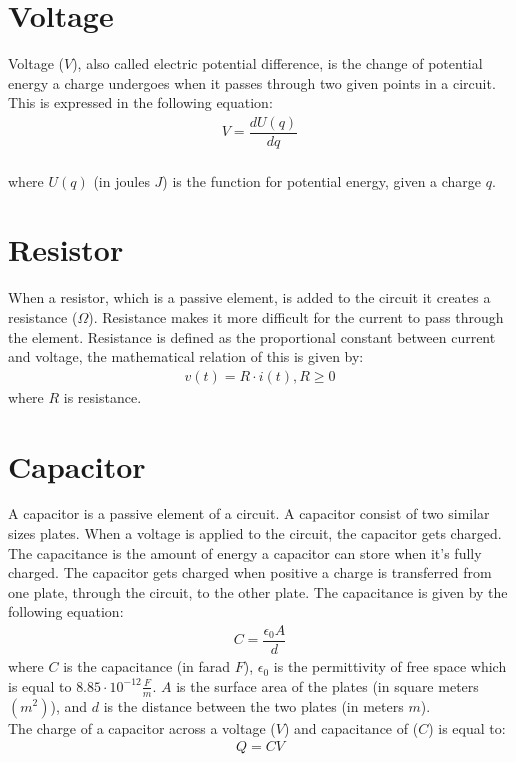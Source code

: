 \section{Voltage}
Voltage ($V$), also called electric potential difference, is the change of potential energy a charge undergoes when it passes through two given points in a circuit. This is expressed in the following equation:
\begin{align}
	V=\dfrac{dU(q)}{dq}
\end{align}
\\
where $U(q)$ (in joules $J$) is the function for potential energy, given a charge $q$.
\section{Resistor}
When a resistor, which is a passive element, is added to the circuit it creates a resistance ($\Omega$). Resistance makes it more difficult for the current to pass through the element. Resistance is defined as the proportional constant between current and voltage, the mathematical relation of this is given by:
\begin{align} 
\label{Ohm}
v(t)=R\cdot i(t),  R\geq0
\end{align}
where $R$ is resistance.
\section{Capacitor}
A capacitor is a passive element of a circuit. A capacitor consist of two similar sizes plates. When a voltage is applied to the circuit, the capacitor gets charged. The capacitance is the amount of energy a capacitor can store when it's fully charged. The capacitor gets charged when positive a charge is transferred from one plate, through the circuit, to the other plate. The capacitance is given by the following equation:
\begin{align*}
C=\dfrac{\epsilon_{0}A}{d}
\end{align*}
where $C$ is the capacitance (in farad $F$), $\epsilon_{0}$ is the permittivity of free space which is equal to $8.85 \cdot 10^{-12}                                                 \frac{F}{m}$. $A$ is the surface area of the plates (in square meters $(m^{2})$), and $d$ is the distance between the two plates (in meters $m$).
\\
The charge of a capacitor across a voltage ($V$) and capacitance of ($C$) is equal to:
\begin{align}
\label{QCV}
Q=CV	
\end{align}

